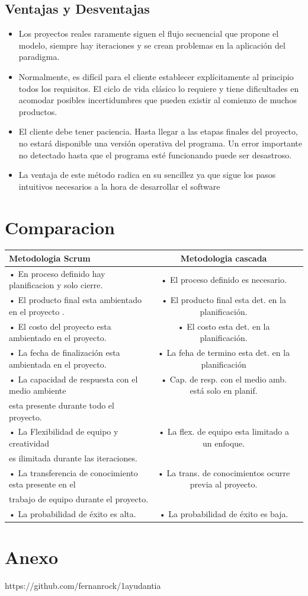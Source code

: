 \documentclass[10pt]{article}
\begin{document}
\subsection{Ventajas y Desventajas}
\begin{itemize}
\item 	Los proyectos reales raramente siguen el flujo secuencial que propone el modelo, siempre hay iteraciones y se crean problemas en la aplicación del paradigma.
\item 	Normalmente, es difícil para el cliente establecer explícitamente al principio  todos los requisitos. El ciclo de vida clásico lo requiere y tiene dificultades en acomodar posibles incertidumbres que pueden existir al comienzo de muchos productos.
\item 	El cliente debe tener paciencia. Hasta llegar a las etapas finales del proyecto, no estará disponible una versión operativa del programa. Un error importante no detectado hasta que el programa esté funcionando puede ser desastroso.
\item La ventaja de este método radica en su sencillez ya que sigue los pasos intuitivos necesarios a la hora de desarrollar el software
\end{itemize}




\newpage
\section{Comparacion}


\begin{tabular}{|lc|l|} \hline
\multicolumn{1}{|p{5cm}|}{\centering %
Metodologia Scrum} & \multicolumn{1}{|p{5cm}|}{\centering %
Metodologia cascada} \tabularnewline \hline
 • En proceso definido hay planificacion y solo cierre.   &  • El proceso definido es necesario.\\
 • El producto final esta ambientado en el proyecto . &  • El producto final esta det. en la planificación.\\
 • El costo del proyecto esta ambientado en el proyecto. & • El costo esta det. en la planificación. \\
 • La fecha de finalización esta ambientada en el proyecto. & • La feha de termino esta det. en la planificación \\
 • La capacidad de respuesta con el medio ambiente & • Cap. de resp. con el medio amb. está  solo en planif.\\
      esta presente durante todo el proyecto.\\
 • La Flexibilidad de equipo y creatividad  & • La flex. de equipo esta limitado a un enfoque.\\
     es ilimitada durante las iteraciones.\\
 • La transferencia de conocimiento esta presente en el &• La trans. de conocimientos ocurre previa al proyecto.\\
      trabajo de equipo durante el proyecto.\\
 • La probabilidad de éxito es alta. & • La probabilidad de éxito es baja.\\
 \hline
\end{tabular}




\section{Anexo}


https://github.com/fernanrock/1ayudantia
\end{document}
